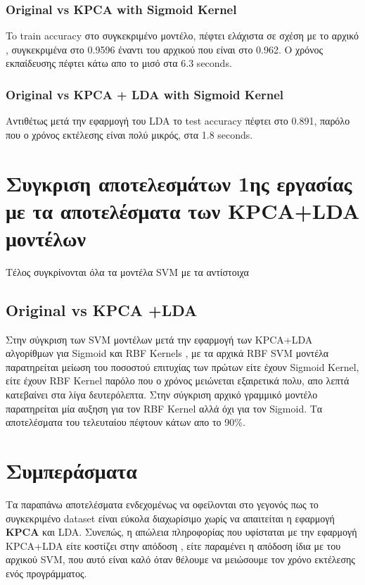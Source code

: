\subsubsection{Original vs KPCA with Sigmoid Kernel}
To train accuracy στο συγκεκριμένο μοντέλο, πέφτει ελάχιστα σε σχέση με το αρχικό , συγκεκριμένα στο 0.9596 έναντι του αρχικού που είναι στο 0.962. Ο χρόνος εκπαίδευσης πέφτει κάτω απο το μισό στα 6.3 seconds.

\subsubsection{Original vs KPCA + LDA with Sigmoid Kernel}
Αντιθέτως μετά την εφαρμογή του LDA το test accuracy πέφτει στο 0.891, παρόλο που ο χρόνος εκτέλεσης είναι πολύ μικρός, στα 1.8 seconds.

\section{Συγκριση αποτελεσμάτων 1ης εργασίας με τα αποτελέσματα των KPCA+LDA μοντέλων}
Τέλος συγκρίνονται όλα τα μοντέλα SVM με τα αντίστοιχα 
\subsection{Original vs KPCA +LDA}
Στην σύγκριση των SVM μοντέλων μετά την εφαρμογή των KPCA+LDA αλγορίθμων για Sigmoid και RBF Kernels , με τα αρχικά RBF SVM μοντέλα παρατηρείται μείωση του ποσοστού επιτυχίας των πρώτων είτε έχουν Sigmoid Kernel, είτε έχουν RBF Kernel παρόλο που ο χρόνος μειώνεται εξαιρετικά πολυ, απο λεπτά κατεβαίνει στα λίγα δευτερόλεπτα. Στην σύγκριση αρχικό γραμμικό μοντέλο παρατηρείται μία αυξηση για τον RBF Kernel αλλά όχι για τον Sigmoid. Τα αποτελέσματα του τελευταίου πέφτουν κάτων απο το 90\%.
\section{Συμπεράσματα}
Τα παραπάνω αποτελέσματα ενδεχομένως να οφείλονται στο γεγονός πως το συγκεκριμένο dataset είναι εύκολα διαχωρίσιμο χωρίς να απαιτείται η εφαρμογή \textbf{KPCA} και LDA. Συνεπώς, η απώλεια πληροφορίας που υφίσταται με την εφαρμογή KPCA+LDA είτε κοστίζει στην απόδοση , είτε παραμένει η απόδοση ίδια με του αρχικού SVM, που αυτό είναι καλό όταν θέλουμε να μειώσουμε τον χρόνο εκτέλεσης ενός προγράμματος.
